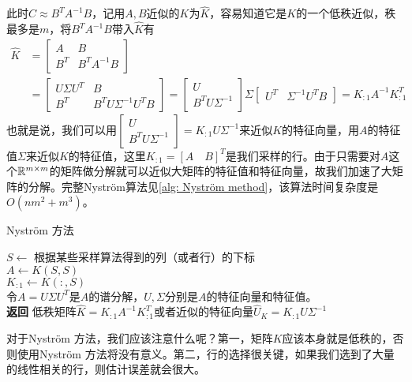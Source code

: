 此时$C \approx B^T A^{-1} B$，记用$A,B$近似的$K$为$\hat{K}$，容易知道它是$K$的一个低秩近似，秩最多是$m$，将$B^T A^{-1} B$带入$\hat{K}$有
\begin{align}
    \hat{K} & = \begin{bmatrix}
            A & B \\
            B^T & B^T A^{-1} B
          \end{bmatrix} \\
          & = \begin{bmatrix}
              U\Sigma U^T & B \\
            B^T & B^T U \Sigma^{-1} U^T B
          \end{bmatrix}
          = \begin{bmatrix}
            U \\
            B^T U \Sigma^{-1}
          \end{bmatrix} \Sigma
          \begin{bmatrix}
            U^T & \Sigma^{-1}U^T B
          \end{bmatrix}
          = K_{:1}A^{-1}K_{:1}^T
\end{align}
也就是说，我们可以用$\begin{bmatrix} U \\ B^T U \Sigma^{-1} \end{bmatrix} = K_{:1}U\Sigma^{-1}$来近似$K$的特征向量，用$A$的特征值$\Sigma$来近似$K$的特征值，这里$K_{:1} = [A \quad B]^T$是我们采样的行。由于只需要对$A$这个$\mathbb{R}^{m\times m}$的矩阵做分解就可以近似大矩阵的特征值和特征向量，故我们加速了大矩阵的分解。完整Nyström算法见\ref{alg: Nyström method}，该算法时间复杂度是$O(nm^2 + m^3)$。
\begin{algorithm}
    \caption{Nyström 方法}\label{alg: Nyström method}
    $S \gets$ 根据某些采样算法得到的列（或者行）的下标 \\
    $A \gets K(S,S)$ \\
    $K_{:1} \gets K(:,S)$ \\
    令$A = U\Sigma U^T$是$A$的谱分解，$U,\Sigma$分别是$A$的特征向量和特征值。\\
    \textbf{返回} 低秩矩阵$\hat{K} = K_{:1}A^{-1}K_{:1}^T$或者近似的特征向量$\hat{U}_K = K_{:1}U\Sigma^{-1}$
\end{algorithm} 
对于Nyström 方法，我们应该注意什么呢？第一，矩阵$K$应该本身就是低秩的，否则使用Nyström 方法将没有意义。第二，行的选择很关键，如果我们选到了大量的线性相关的行，则估计误差就会很大。

